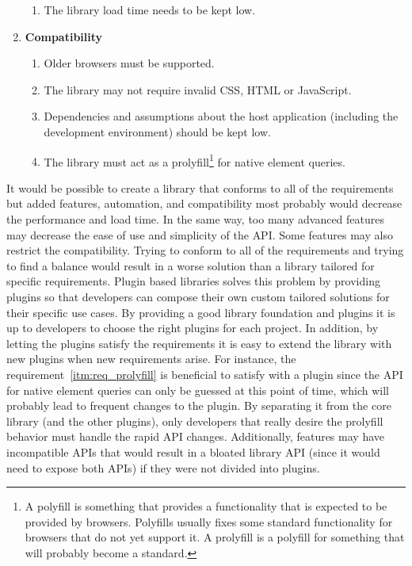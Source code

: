 \documentclass[a4paper,11pt]{kth-mag}
\begin{document}
\begin{enumerate}
\begin{enumerate}
            \item The library load time needs to be kept low.
          \end{enumerate}
        \item \textbf{Compatibility}
          \begin{enumerate}
            \item Older \glspl{browser} must be supported.
            \item The library may not require invalid \gls{CSS}, \gls{HTML} or \gls{JavaScript}.
            \item\label{itm:assumption} Dependencies and assumptions about the host application (including the development environment) should be kept low.
            \item\label{itm:req_prolyfill} The library must act as a prolyfill\footnote{A polyfill is something that provides a functionality that is expected to be provided  by \glspl{browser}. Polyfills usually fixes some standard functionality for \glspl{browser} that do not yet support it. A prolyfill is a polyfill for something that will probably become a standard.} for \gls{native} element queries.
          \end{enumerate}
      \end{enumerate}
      It would be possible to create a library that conforms to all of the requirements but added features, automation, and compatibility most probably would decrease the performance and load time.
      In the same way, too many advanced features may decrease the ease of use and simplicity of the \gls{API}.
      Some features may also restrict the compatibility.
      Trying to conform to all of the requirements and trying to find a balance would result in a worse solution than a library tailored for specific requirements.
      Plugin based libraries solves this problem by providing plugins so that developers can compose their own custom tailored solutions for their specific use cases.
      By providing a good library foundation and plugins it is up to developers to choose the right plugins for each project.
      In addition, by letting the plugins satisfy the requirements it is easy to extend the library with new plugins when new requirements arise.
      For instance, the requirement~\ref{itm:req_prolyfill} is beneficial to satisfy with a plugin since the \gls{API} for \gls{native} element queries can only be guessed at this point of time, which will probably lead to frequent changes to the plugin.
      By separating it from the core library (and the other plugins), only developers that really desire the prolyfill behavior must handle the rapid \gls{API} changes.
      Additionally, features may have incompatible \glspl{API} that would result in a bloated library \gls{API} (since it would need to expose both \glspl{API}) if they were not divided into plugins.
\end{document}
